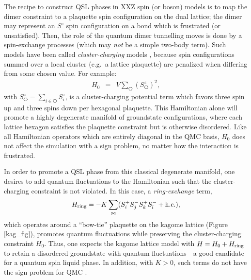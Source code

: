 \documentclass[range]{ar2e}
\begin{document}
The recipe to construct QSL phases in XXZ spin (or boson) models is to map the dimer constraint to a plaquette spin configuration on the dual lattice; the dimer may represent an $S^z$ spin configuration on a bond which is frustrated (or unsatisfied).  Then, the role of the quantum dimer tunnelling moves is done by a spin-exchange processes (which may {\it not} be a simple two-body term).  Such models have been called
{\it cluster-charging} models \cite{Isakov2}, because spin configurations summed over a local cluster (e.g.~a lattice plaquette) are penalized when differing from some chosen value.  For example:
\begin{eqnarray}
H_0 &=& V \sum_{\hexagon} (S^z_{\hexagon})^2,  \label{H0}
\end{eqnarray}
with $S^z_{\hexagon} = \sum_{i \in \hexagon}S^z_i$,
is a cluster-charging potential term which favors three spin up and three spins down per hexagonal plaquette.  This Hamiltonian alone will promote a highly degenerate manifold of groundstate configurations, where each lattice hexagon satisfies the plaquette constraint but is otherwise disordered.  
Like all Hamiltonian operators which are entirely diagonal in the QMC basis, $H_0$ does not affect the simulation with a sign problem, no matter how the interaction is frustrated.

In order to promote a QSL phase from this classical degenerate manifold, one desires to add quantum fluctuations to the Hamiltonian such that the cluster-charging constraint is not violated.  In this case, a {\it ring-exchange} term, 
\begin{eqnarray}
H_{\rm ring} = -K \sum_{\bowtie} ( S_i^{+} S_j^{-} S_k^{+} S_l^{-} + {\rm h.c.} ),
\end{eqnarray} 
which operates around a ``bow-tie'' plaquette on the kagome lattice (Figure \ref{kag_fig}),
promotes quantum fluctuations while preserving the cluster-charging constraint $H_0$.  Thus, one expects the kagome lattice model with $H = H_0 + H_{\rm ring}$ to retain a disordered groundstate with quantum fluctuations - a good candidate for a quantum spin liquid phase.  In addition, with $K>0$, such terms do not have the sign problem for QMC \cite{JKqmc}.
\end{document}
